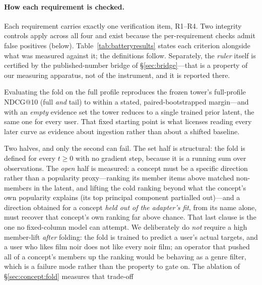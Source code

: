 \documentclass[11pt]{article}
\begin{document}
\paragraph{How each requirement is checked.}
Each requirement carries exactly one verification item, R1--R4. Two integrity
controls apply across all four and exist because the per-requirement checks admit false positives
(below). Table~\ref{tab:batteryresults} states each criterion alongside what was measured against it; the definitions follow. Separately, the
\emph{ruler} itself is certified by the published-number bridge of \S\ref{sec:bridge}---that is a property
of our measuring apparatus, not of the instrument, and it is reported there.

\begin{description}[leftmargin=2.4em,itemsep=1.5pt]
  \item[R1 --- full strength and identity.] Evaluating the fold on the full profile reproduces the
        frozen tower's full-profile NDCG@10 (full \emph{and} tail) to within a stated, paired-bootstrapped margin---and with an
        \emph{empty} evidence set the tower reduces to a single trained prior latent, the same one for every user.
        That fixed starting point is what licenses reading every later curve as evidence about ingestion rather
        than about a shifted baseline.
  \item[R2 --- an open set-valued input interface.] Two halves, and only the second can fail. The set half is
        structural: the fold is defined for every $t\ge0$ with no gradient step, because it is a running sum
        over observations. The \emph{open} half is measured: a concept must be a specific direction rather than a
        popularity proxy---ranking its member items above matched non-members in the latent, and lifting the cold
        ranking beyond what the concept's own popularity explains (its top principal component partialled out)---and
        a direction obtained for a concept \emph{held out of the adapter's fit}, from its name alone, must recover
        that concept's own ranking far above chance. That last clause is the one no fixed-column model can attempt.
        We deliberately do \emph{not} require a high member-lift \emph{after} folding: the fold is trained to predict
        a user's actual targets, and a user who likes film noir does not like every noir film; an operator that
        pushed all of a concept's members up the ranking would be behaving as a genre filter, which is a failure
        mode rather than the property to gate on. The ablation of \S\ref{sec:concept:fold} measures that trade-off

\end{description}
\end{document}
